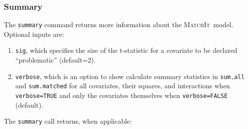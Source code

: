 \documentclass[oneside,letterpaper,titlepage]{article}
\newcommand{\MatchIt}{\textsc{MatchIt}}
\begin{document}
\subsubsection{Summary}
\label{cmd:sum}
The \texttt{summary} command returns more information about the
\MatchIt\ model.  Optional inputs are:

\begin{enumerate}
\item \texttt{sig}, which specifies the size of the t-statistic for a
  covariate to be declared ``problematic'' (default=2).
  
\item \texttt{verbose}, which is an option to show calculate summary
  statistics in \texttt{sum.all} and \texttt{sum.matched} for all
  covariates, their squares, and interactions when
  \texttt{verbose=TRUE} and only the covariates themselves when
  \texttt{verbose=FALSE} (default).
\end{enumerate}

The \texttt{summary} call returns, when applicable:
\end{document}
